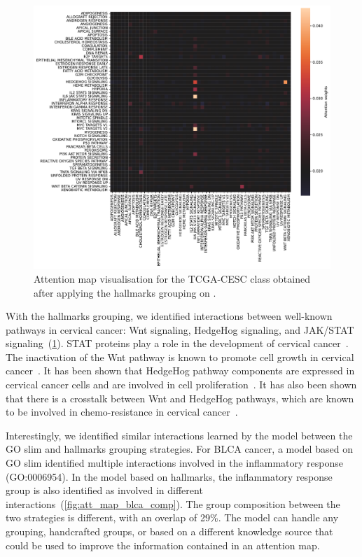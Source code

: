 \documentclass[../main.tex]{subfiles}
\begin{document}
		\begin{figure}[htbp]
			\centering
			\includegraphics[width=\textwidth]{Beaude.168.fig.4.pdf}
			\caption{Attention map visualisation for the TCGA-CESC class obtained after applying the hallmarks grouping on .}\label{fig:att_map_viz}
		\end{figure}

		With the hallmarks grouping, we identified interactions between well-known pathways in cervical cancer: Wnt signaling, HedgeHog signaling, and JAK/STAT signaling~(\cref{fig:att_map_viz}).
		STAT proteins play a role in the development of cervical cancer~\cite{gutierrez-hoyaRoleJAKSTAT2020}.
		The inactivation of the Wnt pathway is known to promote cell growth in cervical cancer~\cite{yangWntSignalingCervical2018}.
		It has been shown that HedgeHog pathway components are expressed in cervical cancer cells and are involved in cell proliferation~\cite{samarzijaHedgehogPathwayRegulators2012}.
		It has also been shown that there is a crosstalk between Wnt and HedgeHog pathways, which are known to be involved in chemo-resistance in cervical cancer~\cite{kumarRoleNotchHedgehog2021}.

		Interestingly, we identified similar interactions learned by the model between the GO slim and hallmarks grouping strategies.
		For BLCA cancer, a model based on GO slim identified multiple interactions involved in the inflammatory response (GO:0006954).
		In the model based on hallmarks, the inflammatory response group is also identified as involved in different interactions~(\cref{fig:att_map_blca_comp}).
		The group composition between the two strategies is different, with an overlap of 29\%.
		The model can handle any grouping, handcrafted groups, or based on a different knowledge source that could be used to improve the information contained in an attention map.
\end{document}
